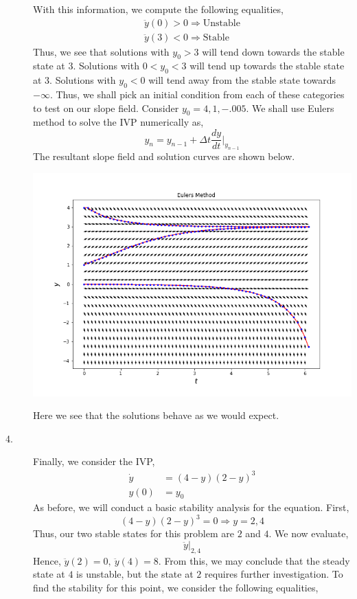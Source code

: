 \documentclass[letterpaper,10pt]{article}
\begin{document}
\begin{description}
With this information, we compute the following equalities,
\begin{align*}
\ddot{y}(0)>0\Rightarrow \text{Unstable}\\
\ddot{y}(3)<0\Rightarrow \text{Stable}
\end{align*}
Thus, we see that solutions with $y_0>3$ will tend down towards the stable state at $3$. Solutions with $0<y_0<3$ will tend up towards the stable state at $3$. Solutions with $y_0<0$ will tend away from the stable state towards $-\infty$. Thus, we shall pick an initial condition from each of these categories to test on our slope field. Consider $y_0=4,1,-.005$. We shall use Eulers method to solve the IVP numerically as,
\[y_n=y_{n-1}+\Delta t\frac{dy}{dt}\bigg|_{y_{n-1}}\]
The resultant slope field and solution curves are shown below.
\begin{center}
\includegraphics[scale=.7]{euler.png}
\end{center}
Here we see that the solutions behave as we would expect.
\item[4.] Finally, we consider the IVP,
\begin{align*}
\dot{y}&=(4-y)(2-y)^3\\
y(0)&=y_0
\end{align*}
As before, we will conduct a basic stability analysis for the equation. First,
\[(4-y)(2-y)^3=0\Rightarrow y=2,4\]
Thus, our two stable states for this problem are $2$ and $4$. We now evaluate,
\[\ddot{y}\big|_{2,4}\]
Hence, $\ddot{y}(2)=0,\ \ddot{y}(4)=8$. From this, we may conclude that the steady state at $4$ is unstable, but the state at $2$ requires further investigation. To find the stability for this point, we consider the following equalities,

\end{description}
\end{document}
